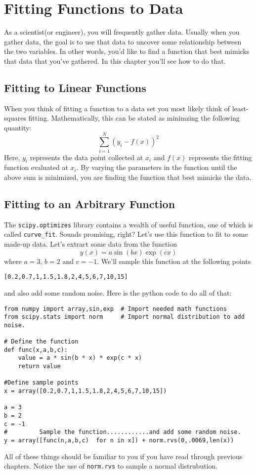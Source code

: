 \chapter{Fitting Functions to Data}
\label{chap:Fitting}

As a scientist(or engineer), you will frequently gather data.  Usually
when you gather data, the goal is to use that data to uncover some
relationship between the two variables.  In other words, you'd like to
find a function that best mimicks that data that you've gathered.  In
this chapter you'll see how to do that.

\section{Fitting to Linear Functions}
When you think of fitting a function to a data set you most likely
think of least-squares fitting.  Mathematically, this can be stated
as minimzing the following quantity:
\begin{equation}
\sum_{i=1}^N (y_i - f(x))^2
\end{equation}
Here, $y_i$ represents the data point collected at $x_i$ and $f(x)$ represents
the fitting function evaluated at $x_i$.  By varying the parameters in
the function until the above sum is minimized, you are finding the
function that best mimicks the data.

\section{Fitting to an Arbitrary Function}
The \texttt{scipy.optimizes} library contains a wealth of useful function, one
of which is called \texttt{curve\_fit}.  Sounds promising, right?
Let's use this function to fit to some made-up data.  Let's extract
some data from the function
\begin{equation}
y(x)  = a \sin(b x) \exp(c x)
\end{equation}
where $a = 3$, $b=2$ and $c= -1$.  We'll sample this function at the
following points
\begin{Verbatim}
[0.2,0.7,1,1.5,1.8,2,4,5,6,7,10,15]
\end{Verbatim}
and also add some random noise.  Here is the python code to do all of
that:
\begin{Verbatim}
from numpy import array,sin,exp  # Import needed math functions
from scipy.stats import norm     # Import normal distribution to add noise.

# Define the function
def func(x,a,b,c):
    value = a * sin(b * x) * exp(c * x)
    return value

#Define sample points
x = array([0.2,0.7,1,1.5,1.8,2,4,5,6,7,10,15])

a = 3
b = 2
c = -1
#         Sample the function............and add some random noise.
y = array([func(n,a,b,c)  for n in x]) + norm.rvs(0,.0069,len(x))
\end{Verbatim}
All of these things should be familiar to you if you have read through
previous chapters.  Notice the use of \texttt{norm.rvs} to sample a
normal distrubution.

